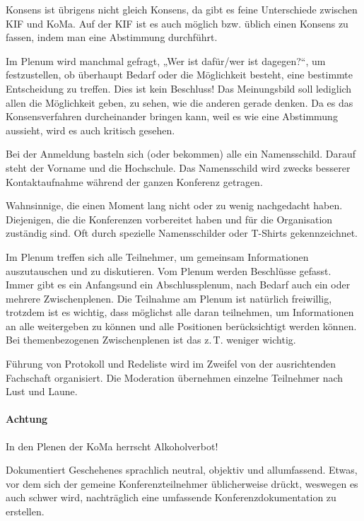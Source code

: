\documentclass{neulingsheft}
\begin{document}
{\begin{description}
	Konsens ist übrigens nicht gleich Konsens, da gibt es feine Unterschiede
	zwischen KIF und KoMa. Auf der KIF ist es auch möglich bzw. üblich einen
	Konsens zu fassen, indem man eine Abstimmung durchführt.

\item[Meinungsbild] Im Plenum wird manchmal gefragt, „Wer ist dafür/wer ist
	dagegen?“, um festzustellen, ob überhaupt Bedarf oder die Möglichkeit
	besteht, eine bestimmte Entscheidung zu treffen. Dies ist kein Beschluss!
	Das Meinungsbild soll lediglich allen die Möglichkeit geben, zu sehen, wie
	die anderen gerade denken. Da es das Konsensverfahren durcheinander bringen
	kann, weil es wie eine Abstimmung aussieht, wird es auch kritisch gesehen.

\item[Namensschild] Bei der Anmeldung basteln sich (oder bekommen) alle ein
	Namensschild. Darauf steht der Vorname und die Hochschule. Das Namensschild
	wird zwecks besserer Kontaktaufnahme während der ganzen Konferenz getragen.

\item[Orga] Wahnsinnige, die einen Moment lang nicht oder zu wenig nachgedacht
	haben. Diejenigen, die die Konferenzen vorbereitet haben und für die
	Organisation zuständig sind.  Oft durch spezielle Namensschilder oder
	T-Shirts gekennzeichnet.

\item[Plenum] Im Plenum treffen sich alle Teilnehmer, um gemeinsam
	Informationen auszutauschen und zu diskutieren. Vom Plenum werden
	Beschlüsse gefasst. Immer gibt es ein Anfangsund ein Abschlussplenum, nach
	Bedarf auch ein oder mehrere Zwischenplenen. Die Teilnahme am Plenum ist
	natürlich freiwillig, trotzdem ist es wichtig, dass möglichst alle daran
	teilnehmen, um Informationen an alle weitergeben zu können und alle
	Positionen berücksichtigt werden können. Bei themenbezogenen Zwischenplenen
	ist das z.\,T.  weniger wichtig.

	Führung von Protokoll und Redeliste wird im Zweifel von der ausrichtenden
	Fachschaft organisiert. Die Moderation übernehmen einzelne Teilnehmer nach
	Lust und Laune.

	\paragraph{Achtung} In den Plenen der KoMa herrscht Alkoholverbot!

\item[Protokoll] Dokumentiert Geschehenes sprachlich neutral, objektiv und
	allumfassend. Etwas, vor dem sich der gemeine Konferenzteilnehmer
	üblicherweise drückt, weswegen es auch schwer wird, nachträglich eine
	umfassende Konferenzdokumentation zu erstellen.


\end{description}}
\end{document}
